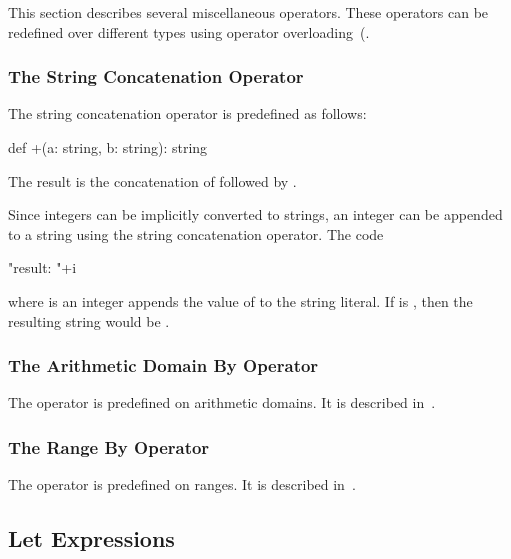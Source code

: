 This section describes several miscellaneous operators.  These
operators can be redefined over different types using operator
overloading~(.

\subsubsection{The String Concatenation Operator}
\label{The_String_Concatenation_Operator}

The string concatenation operator is predefined as follows:
\begin{chapel}
def +(a: string, b: string): string
\end{chapel}
The result is the concatenation of  followed by .
\begin{example}
Since integers can be implicitly converted to strings, an integer can
be appended to a string using the string concatenation operator.  The
code
\begin{chapel}
"result: "+i
\end{chapel}
where  is an integer appends the value of  to the
string literal.  If  is , then the resulting string
would be .
\end{example}

\subsubsection{The Arithmetic Domain By Operator}
\label{The_Arithmetic_Domain_By_Operator}

The operator  is predefined on arithmetic domains.  It is
described in~.

\subsubsection{The Range By Operator}
\label{The_Range_By_Operator}

The operator  is predefined on ranges.  It is
described in~.

\subsection{Let Expressions}
\label{Let_Expressions}

